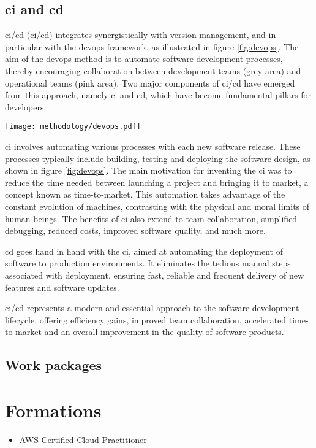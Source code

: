 \subsection{\acrfull{ci} and \acrfull{cd}}
\acrshort{ci}/\acrshort{cd} (\acrlong{ci}/\acrlong{cd}) integrates synergistically with version management, and in particular with the \acrshort{devops} framework, as illustrated in figure \ref{fig:devops}. The aim of the \acrshort{devops} method is to automate software development processes, thereby encouraging collaboration between development teams (grey area) and operational teams (pink area). Two major components of \acrshort{ci}/\acrshort{cd} have emerged from this approach, namely \acrfull{ci} and \acrfull{cd}, which have become fundamental pillars for developers.
\begin{center}
    \begingroup
    \texttt{[image: methodology/devops.pdf]}
    \label{fig:devops}
    \endgroup
\end{center}
\acrshort{ci} involves automating various processes with each new software release. These processes typically include building, testing and deploying the software design, as shown in figure \ref{fig:devops}. The main motivation for inventing the \acrshort{ci} was to reduce the time needed between launching a project and bringing it to market, a concept known as time-to-market. This automation takes advantage of the constant evolution of machines, contrasting with the physical and moral limits of human beings. The benefits of \acrshort{ci} also extend to team collaboration, simplified debugging, reduced costs, improved software quality, and much more.

\acrshort{cd} goes hand in hand with the \acrshort{ci}, aimed at automating the deployment of software to production environments. It eliminates the tedious manual steps associated with deployment, ensuring fast, reliable and frequent delivery of new features and software updates.

\acrshort{ci}/\acrshort{cd} represents a modern and essential approach to the software development lifecycle, offering efficiency gains, improved team collaboration, accelerated time-to-market and an overall improvement in the quality of software products.

\subsection{Work packages}


\section{Formations}

\begin{itemize}
    \item AWS Certified Cloud Practitioner
\end{itemize}